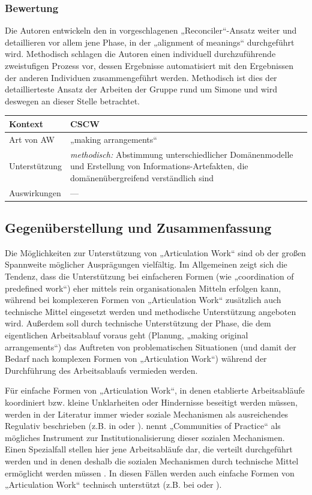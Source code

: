 \subsubsection{Bewertung}
Die Autoren entwickeln den in \citet{Sarini02} vorgeschlagenen „Reconciler“-Ansatz weiter und detaillieren vor allem jene Phase, in der „alignment of meanings“ durchgeführt wird. Methodisch schlagen die Autoren einen individuell durchzuführende zweistufigen Prozess vor, dessen Ergebnisse automatisiert mit den Ergebnissen der anderen Individuen zusammengeführt werden. Methodisch ist dies der detaillierteste Ansatz der Arbeiten der Gruppe rund um Simone und wird deswegen an dieser Stelle betrachtet.
\\[1em]
\begin{tabular}{| p{3cm} | p{10cm} |}
  \hline
  Kontext & \gls{CSCW} \\ \hline
  Art von AW & „making arrangements“ \\ \hline
  Unterstützung & \emph{methodisch:} Abstimmung unterschiedlicher Domänenmodelle und Erstellung von Informations-Artefakten, die domänenübergreifend verständlich sind \\ \hline
  Auswirkungen & --- \\ \hline
\end{tabular}

\subsection{Gegenüberstellung und Zusammenfassung} %
\label{sub:gegenüberstellung_und_zusammenfassung}

Die Möglichkeiten zur Unterstützung von „Articulation Work“ sind ob der großen Spannweite möglicher Ausprägungen vielfältig. Im Allgemeinen zeigt sich die Tendenz, dass die Unterstützung bei einfacheren Formen (wie „coordination of predefined work“) eher mittels rein organisationalen Mitteln erfolgen kann, während bei komplexeren Formen von „Articulation Work“ zusätzlich auch technische Mittel eingesetzt werden und methodische Unterstützung angeboten wird. Außerdem soll durch technische Unterstützung der Phase, die dem eigentlichen Arbeitsablauf voraus geht (Planung, „making original arrangements“) das Auftreten von problematischen Situationen (und damit der Bedarf nach komplexen Formen von „Articulation Work“) während der Durchführung des Arbeitsablaufs vermieden werden.

Für einfache Formen von „Articulation Work“, in denen etablierte Arbeitsabläufe koordiniert bzw. kleine Unklarheiten oder Hindernisse beseitigt werden müssen, werden in der Literatur immer wieder soziale Mechanismen als ausreichendes Regulativ beschrieben (z.B. in \citep{Raposo01} oder \citep{Schmidt94}). \citet{Davenport02} nennt „Communities of Practice“ \citep{Wenger99} als mögliches Instrument zur Institutionalisierung dieser sozialen Mechanismen. Einen Spezialfall stellen hier jene Arbeitsabläufe dar, die verteilt durchgeführt werden und in denen deshalb die sozialen Mechanismen durch technische Mittel ermöglicht werden müssen \citep{Faergemann05}. In diesen Fällen werden auch einfache Formen von „Articulation Work“ technisch unterstützt (z.B. bei \citep{Divitini00} oder \citep{Fuchs01}).

